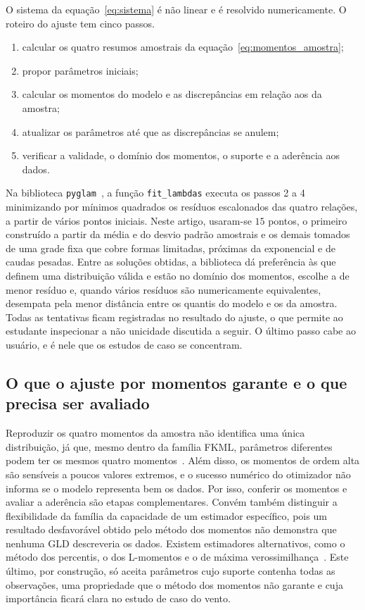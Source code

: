 O sistema da equação~\eqref{eq:sistema} é não linear e é resolvido numericamente. O roteiro do ajuste tem cinco passos.
\begin{enumerate}
    \item calcular os quatro resumos amostrais da equação~\eqref{eq:momentos_amostra};
    \item propor parâmetros iniciais;
    \item calcular os momentos do modelo e as discrepâncias em relação aos da amostra;
    \item atualizar os parâmetros até que as discrepâncias se anulem;
    \item verificar a validade, o domínio dos momentos, o suporte e a aderência aos dados.
\end{enumerate}
Na biblioteca \texttt{pyglam}~\cite{pyglam}, a função \texttt{fit\_lambdas} executa os passos 2 a 4 minimizando por mínimos quadrados os resíduos escalonados das quatro relações, a partir de vários pontos iniciais. Neste artigo, usaram-se $15$ pontos, o primeiro construído a partir da média e do desvio padrão amostrais e os demais tomados de uma grade fixa que cobre formas limitadas, próximas da exponencial e de caudas pesadas. Entre as soluções obtidas, a biblioteca dá preferência às que definem uma distribuição válida e estão no domínio dos momentos, escolhe a de menor resíduo e, quando vários resíduos são numericamente equivalentes, desempata pela menor distância entre os quantis do modelo e os da amostra. Todas as tentativas ficam registradas no resultado do ajuste, o que permite ao estudante inspecionar a não unicidade discutida a seguir. O último passo cabe ao usuário, e é nele que os estudos de caso se concentram.

\subsection{O que o ajuste por momentos garante e o que precisa ser avaliado}

Reproduzir os quatro momentos da amostra não identifica uma única distribuição, já que, mesmo dentro da família FKML, parâmetros diferentes podem ter os mesmos quatro momentos~\cite{karian2011}. Além disso, os momentos de ordem alta são sensíveis a poucos valores extremos, e o sucesso numérico do otimizador não informa se o modelo representa bem os dados. Por isso, conferir os momentos e avaliar a aderência são etapas complementares. Convém também distinguir a flexibilidade da família da capacidade de um estimador específico, pois um resultado desfavorável obtido pelo método dos momentos não demonstra que nenhuma GLD descreveria os dados. Existem estimadores alternativos, como o método dos percentis, o dos L-momentos e o de máxima verossimilhança~\cite{karian2011,su2007}. Este último, por construção, só aceita parâmetros cujo suporte contenha todas as observações, uma propriedade que o método dos momentos não garante e cuja importância ficará clara no estudo de caso do vento.
